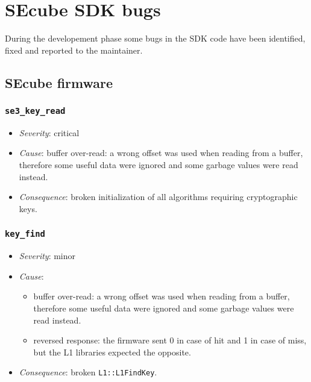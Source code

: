 \chapter{SEcube SDK bugs}
During the developement phase some bugs in the SDK code have been identified,
fixed and reported to the maintainer.
\section{SEcube firmware}
\subsection{\texttt{se3\_key\_read}}
\begin{itemize}
	\item \emph{Severity}: critical
	\item \emph{Cause}: buffer over-read: a wrong offset was used when
		reading from a buffer, therefore some useful data were ignored
		and some garbage values were read instead.
	\item \emph{Consequence}: broken initialization of all algorithms
		requiring cryptographic keys.
\end{itemize}
\subsection{\texttt{key\_find}}
\begin{itemize}
	\item \emph{Severity}: minor
	\item \emph{Cause}:
		\begin{itemize}
			\item buffer over-read: a wrong offset was used when
				reading from a buffer, therefore some useful data were ignored
				and some garbage values were read instead.
			\item reversed response: the firmware sent 0 in case of
				hit and 1 in case of miss, but the L1 libraries
				expected the opposite.
		\end{itemize}
	\item \emph{Consequence}: broken \texttt{L1::L1FindKey}.
\end{itemize}

